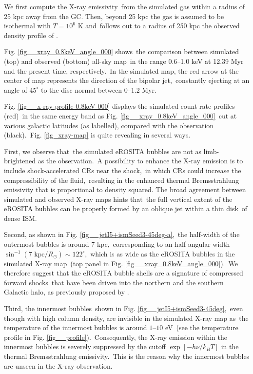 \documentclass[fleqn,usenatbib,useAMS]{mnras}
\begin{document}
  We first compute the X-ray emissivity\
  from the simulated gas within a radius of 25 kpc away from the GC.
  Then, beyond 25 kpc the gas is assumed to be isothermal with $T=10^6$ K and\
  follows out to a radius of 250 kpc the observed density profile of \citep{temperature-MW}.

  Fig. \ref{fig__xray_0.8keV_angle_000} shows\
  the comparison between simulated (top) and observed (bottom) all-sky map\
  in the range 0.6--1.0 keV at 12.39 Myr and the present time, respectively.\
  In the simulated map, the red arrow at the center of map represents the direction of the bipolar jet,\
  constantly ejecting at an angle of $45^{\circ}$ to the disc normal between 0--1.2 Myr.

  Fig. \ref{fig__x-ray-profile-0.8keV-000} displays the simulated count rate profiles (red)\
  in the same energy band as Fig. \ref{fig__xray_0.8keV_angle_000}\
  cut at various galactic latitudes (as labelled), compared with the observation (black).\
  Fig. \ref{fig_xray-map} is quite revealing in several ways.\

  First, we observe that\
  the simulated eROSITA bubbles are not as limb-brightened as the observation.\
  A possibility to enhance the X-ray emission is to include shock-accelerated CRs near the shock,\
  in which CRs could increase the compressibility of the fluid,\
  resulting in the enhanced thermal Bremsstrahlung emissivity that is proportional to density squared.
  The broad agreement between simulated and observed X-ray maps hints that\
  the full vertical extent of the eROSITA bubbles can be properly formed by an oblique jet within a thin disk\
  of dense ISM.

  Second, as shown in Fig. \ref{fig__jetI5+ismSeed3-45deg-a},\
  the half-width of the outermost bubbles is around 7 kpc,\
  corresponding to an half angular width $\sin^{-1}(7 \text{ kpc}/R_{\odot})\sim122^{\circ}$,\
  which is as wide as the eROSITA bubbles in the simulated X-ray map\
  (top panel in Fig. \ref{fig__xray_0.8keV_angle_000}).\
  We therefore suggest that the eROSITA bubble shells are a signature of compressed forward shocks\
  that have been driven into the northern and the southern Galactic halo,
  as previously proposed by \citet{Predehl2020}.


  Third, the innermost bubbles\
  shown in Fig. \ref{fig__jetI5+ismSeed3-45deg},\
  even though with high column density, are invisible in the simulated X-ray map as\
  the temperature of the innermost bubbles is around $1$--$10$ eV\
  (see the temperature profile in Fig. \ref{fig__profile}).\
  Consequently, the X-ray emission within the innermost bubbles
  is severely suppressed by the cutoff $\exp\left[-h\nu/k_{B}T\right]$ in the thermal Bremsstrahlung emissivity.\
  This is the reason why the innermost bubbles are unseen in the X-ray observation.
\end{document}
